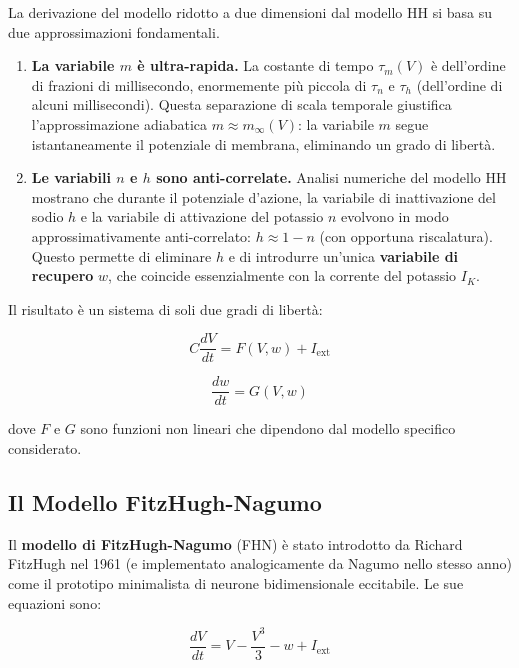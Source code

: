 La derivazione del modello ridotto a due dimensioni dal modello HH si basa su due approssimazioni fondamentali.

\begin{enumerate}
    \item \textbf{La variabile $m$ è ultra-rapida.} La costante di tempo $\tau_m(V)$ è dell'ordine di frazioni di millisecondo, enormemente più piccola di $\tau_n$ e $\tau_h$ (dell'ordine di alcuni millisecondi). Questa separazione di scala temporale giustifica l'approssimazione adiabatica $m \approx m_\infty(V)$: la variabile $m$ segue istantaneamente il potenziale di membrana, eliminando un grado di libertà.
    \item \textbf{Le variabili $n$ e $h$ sono anti-correlate.} Analisi numeriche del modello HH mostrano che durante il potenziale d'azione, la variabile di inattivazione del sodio $h$ e la variabile di attivazione del potassio $n$ evolvono in modo approssimativamente anti-correlato: $h \approx 1 - n$ (con opportuna riscalatura). Questo permette di eliminare $h$ e di introdurre un'unica \textbf{variabile di recupero} $w$, che coincide essenzialmente con la corrente del potassio $I_K$.
\end{enumerate}

Il risultato è un sistema di soli due gradi di libertà:

\begin{equation}
C \frac{dV}{dt} = F(V, w) + I_{\text{ext}}
\end{equation}

\begin{equation}
\frac{dw}{dt} = G(V, w)
\end{equation}

dove $F$ e $G$ sono funzioni non lineari che dipendono dal modello specifico considerato.



\subsection{Il Modello FitzHugh-Nagumo}

Il \textbf{modello di FitzHugh-Nagumo} (FHN) è stato introdotto da Richard FitzHugh nel 1961 (e implementato analogicamente da Nagumo nello stesso anno) come il prototipo minimalista di neurone bidimensionale eccitabile. Le sue equazioni sono:

\begin{equation}
\frac{dV}{dt} = V - \frac{V^3}{3} - w + I_{\text{ext}}
\end{equation}

